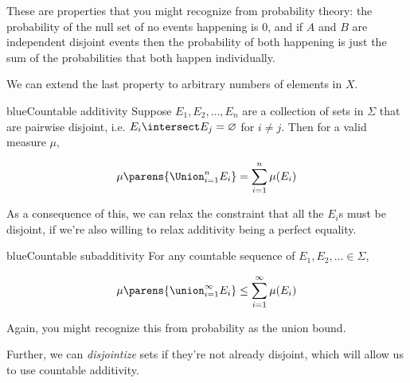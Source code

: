 \documentclass[./analysis.tex]{subfiles}
\begin{document}
    These are properties that you might recognize from probability theory: the probability of the null set of no events happening is 0, and if $A$ and $B$ are independent disjoint events then the probability of both happening is just the sum of the probabilities that both happen individually.

    We can extend the last property to arbitrary numbers of elements in $X$.

    \begin{mycolorbox}{blue}{Countable additivity}
        Suppose $E_1, E_2, \dots, E_n$ are a collection of sets in $\Sigma$ that are pairwise disjoint, i.e. $E_i \intersect E_j = \varnothing$ for $i \neq j$. Then for a valid measure $\mu$,

        \begin{align*}
            \mu\parens{\Union_{i=1}^n E_i} = \sum_{i=1}^n \mu(E_i)
        \end{align*}
    \end{mycolorbox}

    As a consequence of this, we can relax the constraint that all the $E_i$s must be disjoint, if we're also willing to relax additivity being a perfect equality.

    \begin{mycolorbox}{blue}{Countable subadditivity}
        For any countable sequence of $E_1, E_2, \dots \in \Sigma$, 

        \begin{align*}
            \mu\parens{\union_{i=1}^\infty E_i} \leq \sum_{i=1}^\infty \mu(E_i)
        \end{align*}
    \end{mycolorbox}

    Again, you might recognize this from probability as the union bound. 

    Further, we can \emph{disjointize} sets if they're not already disjoint, which will allow us to use countable additivity.
\end{document}
